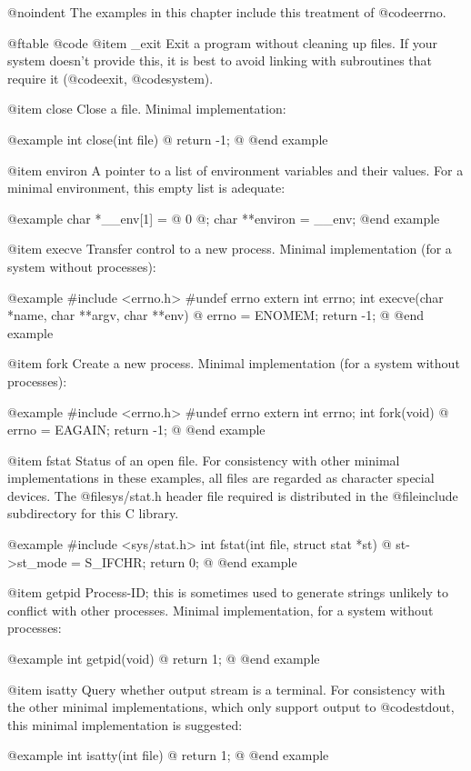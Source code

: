 @noindent
The examples in this chapter include this treatment of @code{errno}.

@ftable @code
@item _exit
Exit a program without cleaning up files.  If your system doesn't
provide this, it is best to avoid linking with subroutines that require
it (@code{exit}, @code{system}).

@item close
Close a file.  Minimal implementation:

@example
int close(int file) @{
  return -1;
@}
@end example

@item environ
A pointer to a list of environment variables and their values.  For a
minimal environment, this empty list is adequate:

@example
char *__env[1] = @{ 0 @};
char **environ = __env;
@end example

@item execve
Transfer control to a new process.  Minimal implementation (for a system
without processes):

@example
#include <errno.h>
#undef errno
extern int errno;
int execve(char *name, char **argv, char **env) @{
  errno = ENOMEM;
  return -1;
@}
@end example

@item fork
Create a new process.  Minimal implementation (for a system without processes):

@example
#include <errno.h>
#undef errno
extern int errno;
int fork(void) @{
  errno = EAGAIN;
  return -1;
@}
@end example

@item fstat
Status of an open file.  For consistency with other minimal
implementations in these examples, all files are regarded as character
special devices.  The @file{sys/stat.h} header file required is
distributed in the @file{include} subdirectory for this C library.

@example
#include <sys/stat.h>
int fstat(int file, struct stat *st) @{
  st->st_mode = S_IFCHR;
  return 0;
@}
@end example

@item getpid
Process-ID; this is sometimes used to generate strings unlikely to
conflict with other processes.  Minimal implementation, for a system
without processes:

@example
int getpid(void) @{
  return 1;
@}
@end example

@item isatty
Query whether output stream is a terminal.   For consistency with the
other minimal implementations, which only support output to
@code{stdout}, this minimal implementation is suggested:

@example
int isatty(int file) @{
  return 1;
@}
@end example

